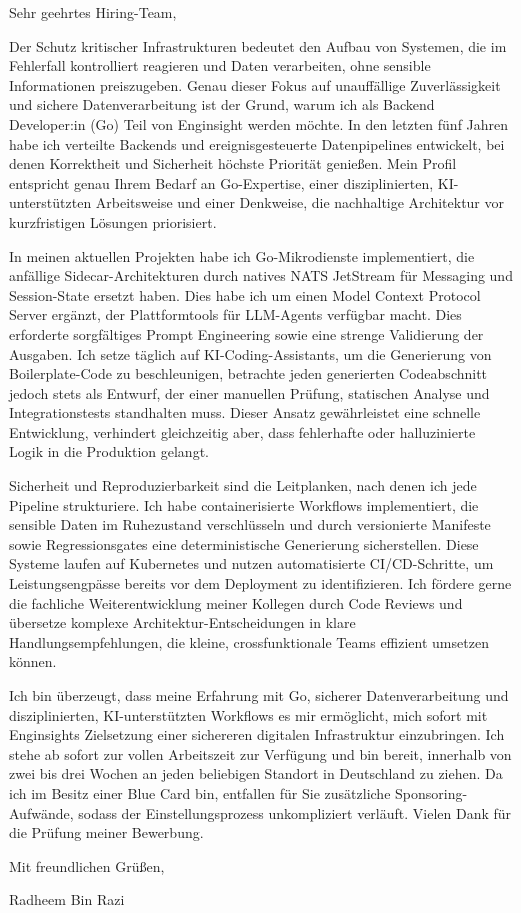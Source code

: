 \documentclass[11pt,a4paper]{coverletter}
\begin{document}

\opening{Sehr geehrtes Hiring-Team,}

Der Schutz kritischer Infrastrukturen bedeutet den Aufbau von Systemen, die im Fehlerfall kontrolliert reagieren und Daten verarbeiten, ohne sensible Informationen preiszugeben. Genau dieser Fokus auf unauffällige Zuverlässigkeit und sichere Datenverarbeitung ist der Grund, warum ich als Backend Developer:in (Go) Teil von Enginsight werden möchte. In den letzten fünf Jahren habe ich verteilte Backends und ereignisgesteuerte Datenpipelines entwickelt, bei denen Korrektheit und Sicherheit höchste Priorität genießen. Mein Profil entspricht genau Ihrem Bedarf an Go-Expertise, einer disziplinierten, KI-unterstützten Arbeitsweise und einer Denkweise, die nachhaltige Architektur vor kurzfristigen Lösungen priorisiert.

In meinen aktuellen Projekten habe ich Go-Mikrodienste implementiert, die anfällige Sidecar-Architekturen durch natives NATS JetStream für Messaging und Session-State ersetzt haben. Dies habe ich um einen Model Context Protocol Server ergänzt, der Plattformtools für LLM-Agents verfügbar macht. Dies erforderte sorgfältiges Prompt Engineering sowie eine strenge Validierung der Ausgaben. Ich setze täglich auf KI-Coding-Assistants, um die Generierung von Boilerplate-Code zu beschleunigen, betrachte jeden generierten Codeabschnitt jedoch stets als Entwurf, der einer manuellen Prüfung, statischen Analyse und Integrationstests standhalten muss. Dieser Ansatz gewährleistet eine schnelle Entwicklung, verhindert gleichzeitig aber, dass fehlerhafte oder halluzinierte Logik in die Produktion gelangt.

Sicherheit und Reproduzierbarkeit sind die Leitplanken, nach denen ich jede Pipeline strukturiere. Ich habe containerisierte Workflows implementiert, die sensible Daten im Ruhezustand verschlüsseln und durch versionierte Manifeste sowie Regressionsgates eine deterministische Generierung sicherstellen. Diese Systeme laufen auf Kubernetes und nutzen automatisierte CI/CD-Schritte, um Leistungsengpässe bereits vor dem Deployment zu identifizieren. Ich fördere gerne die fachliche Weiterentwicklung meiner Kollegen durch Code Reviews und übersetze komplexe Architektur-Entscheidungen in klare Handlungsempfehlungen, die kleine, crossfunktionale Teams effizient umsetzen können.

Ich bin überzeugt, dass meine Erfahrung mit Go, sicherer Datenverarbeitung und disziplinierten, KI-unterstützten Workflows es mir ermöglicht, mich sofort mit Enginsights Zielsetzung einer sichereren digitalen Infrastruktur einzubringen. Ich stehe ab sofort zur vollen Arbeitszeit zur Verfügung und bin bereit, innerhalb von zwei bis drei Wochen an jeden beliebigen Standort in Deutschland zu ziehen. Da ich im Besitz einer Blue Card bin, entfallen für Sie zusätzliche Sponsoring-Aufwände, sodass der Einstellungsprozess unkompliziert verläuft. Vielen Dank für die Prüfung meiner Bewerbung.

\closing{Mit freundlichen Grüßen,}{Radheem Bin Razi}
\end{document}
